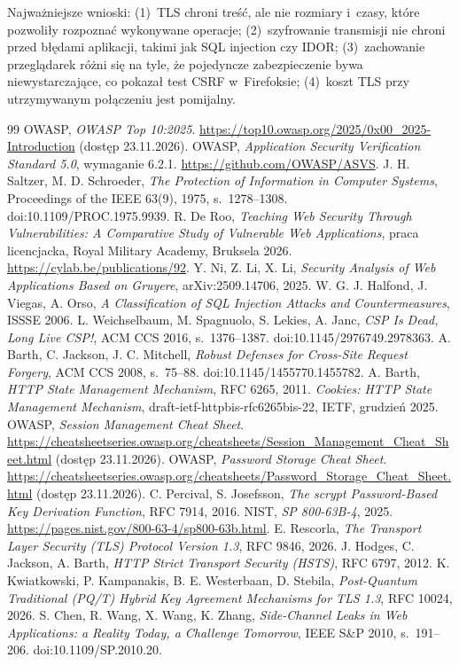 \documentclass[12pt,a4paper]{article}
\begin{document}
Najważniejsze wnioski: (1)~TLS chroni treść, ale nie rozmiary i~czasy, które pozwoliły rozpoznać wykonywane operacje; (2)~szyfrowanie transmisji nie chroni przed błędami aplikacji, takimi jak SQL injection czy IDOR; (3)~zachowanie przeglądarek różni się na tyle, że pojedyncze zabezpieczenie bywa niewystarczające, co pokazał test CSRF w~Firefoksie; (4)~koszt TLS przy utrzymywanym połączeniu jest pomijalny.

\begin{thebibliography}{99}\small
{} OWASP, \emph{OWASP Top 10:2025}. \url{https://top10.owasp.org/2025/0x00_2025-Introduction} (dostęp 23.11.2026).
 OWASP, \emph{Application Security Verification Standard 5.0}, wymaganie 6.2.1. \url{https://github.com/OWASP/ASVS}.
 J. H. Saltzer, M. D. Schroeder, \emph{The Protection of Information in Computer Systems}, Proceedings of the IEEE 63(9), 1975, s.~1278--1308. doi:10.1109/PROC.1975.9939.
 R. De Roo, \emph{Teaching Web Security Through Vulnerabilities: A Comparative Study of Vulnerable Web Applications}, praca licencjacka, Royal Military Academy, Bruksela 2026. \url{https://cylab.be/publications/92}.
 Y. Ni, Z. Li, X. Li, \emph{Security Analysis of Web Applications Based on Gruyere}, arXiv:2509.14706, 2025.
 W. G. J. Halfond, J. Viegas, A. Orso, \emph{A Classification of SQL Injection Attacks and Countermeasures}, ISSSE 2006.
 L. Weichselbaum, M. Spagnuolo, S. Lekies, A. Janc, \emph{CSP Is Dead, Long Live CSP!}, ACM CCS 2016, s.~1376--1387. doi:10.1145/2976749.2978363.
 A. Barth, C. Jackson, J. C. Mitchell, \emph{Robust Defenses for Cross-Site Request Forgery}, ACM CCS 2008, s.~75--88. doi:10.1145/1455770.1455782.
 A. Barth, \emph{HTTP State Management Mechanism}, RFC 6265, 2011.
 \emph{Cookies: HTTP State Management Mechanism}, draft-ietf-httpbis-rfc6265bis-22, IETF, grudzień 2025.
 OWASP, \emph{Session Management Cheat Sheet}. \url{https://cheatsheetseries.owasp.org/cheatsheets/Session_Management_Cheat_Sheet.html} (dostęp 23.11.2026).
 OWASP, \emph{Password Storage Cheat Sheet}. \url{https://cheatsheetseries.owasp.org/cheatsheets/Password_Storage_Cheat_Sheet.html} (dostęp 23.11.2026).
 C. Percival, S. Josefsson, \emph{The scrypt Password-Based Key Derivation Function}, RFC 7914, 2016.
 NIST, \emph{SP 800-63B-4}, 2025. \url{https://pages.nist.gov/800-63-4/sp800-63b.html}.
 E. Rescorla, \emph{The Transport Layer Security (TLS) Protocol Version 1.3}, RFC 9846, 2026.
 J. Hodges, C. Jackson, A. Barth, \emph{HTTP Strict Transport Security (HSTS)}, RFC 6797, 2012.
 K. Kwiatkowski, P. Kampanakis, B. E. Westerbaan, D. Stebila, \emph{Post-Quantum Traditional (PQ/T) Hybrid Key Agreement Mechanisms for TLS 1.3}, RFC 10024, 2026.
 S. Chen, R. Wang, X. Wang, K. Zhang, \emph{Side-Channel Leaks in Web Applications: a Reality Today, a Challenge Tomorrow}, IEEE S\&P 2010, s.~191--206. doi:10.1109/SP.2010.20.
\end{thebibliography}
\end{document}
